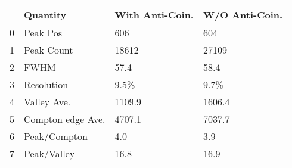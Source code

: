 \begin{tabular}{llll}
\toprule
{} &           Quantity & With Anti-Coin. & W/O Anti-Coin. \\
\midrule
0 &           Peak Pos &             606 &            604 \\
1 &         Peak Count &           18612 &          27109 \\
2 &               FWHM &            57.4 &           58.4 \\
3 &         Resolution &            9.5\% &           9.7\% \\
4 &        Valley Ave. &          1109.9 &         1606.4 \\
5 &  Compton edge Ave. &          4707.1 &         7037.7 \\
6 &       Peak/Compton &             4.0 &            3.9 \\
7 &        Peak/Valley &            16.8 &           16.9 \\
\bottomrule
\end{tabular}
